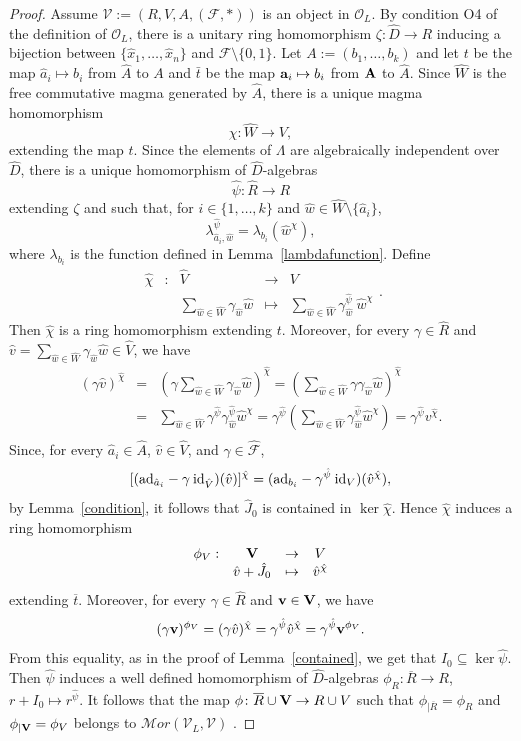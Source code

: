 \documentclass[a4paper]{amsart}
\newcommand{\Amo}{{\mathcal {\bf A}}}
\newcommand{\A}{ {\hat A}}
\newcommand{\Ro}{{\overline R}}
\newcommand{\Vo}{{\bf V}}
\newcommand{\ad}{{\rm ad}}
\newcommand{\aV}{{\hat V}}
\newcommand{\aR}{{\hat R}}
\newcommand{\hW}{{\hat W}}
\newcommand{\hJ}{{\hat J}}
\newcommand{\ha}{{\hat a}}
\newcommand{\hw}{{\hat w}}
\newcommand{\hv}{{\hat v}}
\newcommand{\bv}{{\bf v}}
\newcommand{\ba}{{\bf a}}
\begin{document}
\begin{proof}
Assume  ${\mathcal  V}:=(R, V, A, (\mathcal F, \ast))$ is an object in $\mathcal O_L$. By condition O4 of the definition of $\mathcal O_L$, there is a unitary ring homomorphism  $\zeta:\hat D\to R$  inducing a bijection between $\{\hat x_1,  \ldots , \hat x_n\}$ and $\mathcal F\setminus \{0,1\}$. Let $A:=(b_1, \ldots , b_k)$ and let $t$ be the map $\ha_i\mapsto b_i$ from $\A$ to $A$ and 
$
\bar t$ be the map $\ba_i\mapsto b_i$ from $\Amo$ to $\A$. Since $\hW$ is the free commutative magma generated by $\A$, there is a unique magma homomorphism 
$$\chi:\hW\to V,$$ extending the map $t$. Since the elements of $\Lambda$ are algebraically independent over $\hat D$, there is a unique homomorphism of $\hat D$-algebras 
 $$\hat \psi :\aR\to R$$ extending $\zeta$ and 
  such that,  for $i\in \{1,\ldots , k\}$ and  $\hw \in \hW\setminus \{\ha_i\}$,  
  \begin{equation}\label{lambdax}
 \lambda_{\ha_i, \hw}^{\hat \psi}=\lambda_{b_i}(\hw^\chi),
 \end{equation}
  where $\lambda_{b_i}$ is the function defined in Lemma~\ref{lambdafunction}.  Define 
$$
\begin{array}{rcccc}
\hat \chi &:& \aV& \to &V\\
& & \sum_{\hw\in \hW}\gamma_\hw \hw & \mapsto & \sum_{\hw\in \hW}\gamma_\hw^{\hat \psi}\: \hw^\chi
\end{array}.
$$
Then $\hat \chi$ is a ring homomorphism extending $t$. Moreover,  for every $\gamma\in \aR$ and $\hv=\sum_{\hw\in \hW}\gamma_\hw \hw\in \aV$, we have 
\begin{eqnarray*}
(\gamma  \hv)^{\hat \chi}&=&(\gamma \sum_{\hw\in \hW} \gamma_\hw \hw)^{\hat\chi}=( \sum_{\hw\in \hW} \gamma \gamma_\hw \hw)^{\hat\chi}\\
&=&\sum_{\hw\in \hW}\gamma^{\hat \psi} \gamma_\hw^{\hat \psi} \hw^\chi=\gamma^{\hat \psi}(\sum_{\hw\in \hW} \gamma_\hw^{\hat \psi} \hw^\chi)=\gamma^{\hat \psi} v^{\hat \chi}.\\
\end{eqnarray*}
Since, for every $\ha_i \in \A$, $\hv\in \aV$, and $\gamma \in \hat {\mathcal F}$,
$$
 [ (\ad_{\ha_i}-\gamma\: {\rm id}_\aV) (\hv)]^{\hat \chi} =(\ad_{b_i}-\gamma^{\hat \psi}\: {\rm id}_{V}) (\hv^{\hat \chi}),
$$
by Lemma~\ref{condition}, it follows that $\hJ_0$ is contained in $\ker \hat \chi$. Hence $\hat \chi$ induces a ring homomorphism 
$$\begin{array}{rccc}
\phi_V : &\Vo& \to &V\\
& \hv+\hJ_0 & \mapsto & \hv^{\hat \chi}
\end{array}
$$
 extending $\overline t$. Moreover,  for every $\gamma\in \aR$ and ${\bv}\in \Vo$,  we have
$$
(\gamma \bv)^{\phi_{V}}=(\gamma \hv)^{\hat\chi}=\gamma^{\hat \psi} \hv^{\hat \chi}=\gamma^{\hat \psi} {\bv}^{\phi_{V}}. 
$$
From this equality, as in the proof of Lemma~\ref{contained}, we get that $I_0\subseteq \ker \hat \psi$. Then  $\hat \psi$ induces a well defined homomorphism of $\hat D$-algebras $\phi_{R}:\Ro\to R$, $r+I_0\mapsto r^{\hat\psi}$. It follows that  the map $\phi\colon \Ro\cup \Vo \to R\cup V$ such that $\phi_{|\Ro}=\phi_R$ and $\phi_{|\Vo}=\phi_V$ belongs to ${\mathcal Mor}({\mathcal V}_L, \mathcal V)$ . 


\end{proof}
\end{document}
